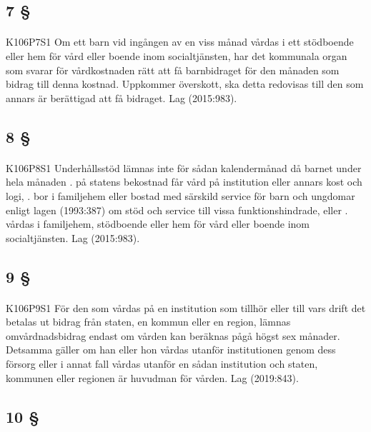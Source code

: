 \documentclass[a4paper,notitlepage,openany,10pt]{book}
\begin{document}
\subsection*{7 §}
\paragraph*{}
{\tiny K106P7S1}
Om ett barn vid ingången av en viss månad vårdas i ett stödboende eller hem för vård eller boende inom socialtjänsten, har det kommunala organ som svarar för vårdkostnaden rätt att få barnbidraget för den månaden som bidrag till denna kostnad. Uppkommer överskott, ska detta redovisas till den som annars är berättigad att få bidraget.
Lag (2015:983).
\subsection*{8 §}
\paragraph*{}
{\tiny K106P8S1}
Underhållsstöd lämnas inte för sådan kalendermånad då barnet under hela månaden
. på statens bekostnad får vård på institution eller annars kost och logi,
. bor i familjehem eller bostad med särskild service för barn och ungdomar enligt lagen (1993:387) om stöd och service till vissa funktionshindrade, eller
. vårdas i familjehem, stödboende eller hem för vård eller boende inom socialtjänsten.
Lag (2015:983).
\subsection*{9 §}
\paragraph*{}
{\tiny K106P9S1}
För den som vårdas på en institution som tillhör eller till vars drift det betalas ut bidrag från staten, en kommun eller en region, lämnas omvårdnadsbidrag endast om vården kan beräknas pågå högst sex månader. Detsamma gäller om han eller hon vårdas utanför institutionen genom dess försorg eller i annat fall vårdas utanför en sådan institution och staten, kommunen eller regionen är huvudman för vården.
Lag (2019:843).
\subsection*{10 §}
\end{document}
